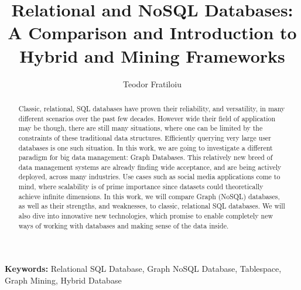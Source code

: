 \documentclass[10pt,        %
               a4paper,     %
               journal,     %
               ]{IEEEtran}
\makeatletter
\def\markboth#1#2{\def\leftmark{\@IEEEcompsoconly{\sffamily}\MakeUppercase{\protect#1}}%
\def\rightmark{\@IEEEcompsoconly{\sffamily}\MakeUppercase{\protect#2}}}
\makeatother
\begin{document}
\title{Relational and NoSQL Databases: A Comparison and Introduction to Hybrid and Mining Frameworks}

\author{Teodor Fratiloiu}%

\markboth{Scientific Seminar on Security in Information Technology, Winter Semester 2020/2021}%
{Teodor Fratiloiu: Comparison of SQL Relational Databases and NoSQL Graph Databases}

\maketitle


\begin{abstract}
Classic, relational, SQL databases have proven their reliability, and versatility, in many different scenarios over the past few decades. However wide their field of application may be though, there are still many situations, where one can be limited by the constraints of these traditional data structures. Efficiently querying very large user databases is one such situation. In this work, we are going to investigate a different paradigm for  big data management: Graph Databases. This relatively new breed of data management systems are already finding wide acceptance, and are being actively deployed, across many industries. Use cases such as social media applications come to mind, where scalability is of prime importance since datasets could theoretically achieve infinite dimensions. In this work, we will compare Graph (NoSQL) databases, as well as their strengths, and weaknesses, to classic, relational SQL databases. We will also dive into innovative new technologies, which promise to enable completely new ways of working with databases and making sense of the data inside.
\end{abstract}

\textbf{Keywords:} Relational SQL Database, Graph NoSQL Database, Tablespace, Graph Mining, Hybrid Database
\end{document}
